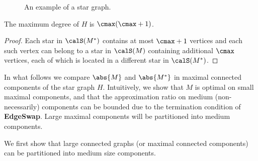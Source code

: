 \begin{figure}
\hspace{3mm}
%
\caption{An example of a star graph.}
\label{fig:conflict}
\end{figure}  

\begin{lemma}
The maximum degree of $H$ is $\cmax(\cmax+1)$.
\end{lemma}
\begin{proof}
Each star in $\calS(M^*)$ contains at most $\cmax+1$ vertices and each
such vertex can belong to a star in $\calS(M)$ containing additional
$\cmax$ vertices, each of which is located in a different star in
$\calS(M^*)$.
\end{proof}

In what follows we compare $\abs{M}$ and $\abs{M^*}$ in maximal
connected components of the star graph $H$.  Intuitively, we show that
$M$ is optimal on small maximal components, and that the approximation
ratio on medium (non-necessarily) components can be bounded due to the
termination condition of \textbf{EdgeSwap}.  Large maximal components
will be partitioned into medium components.

We first show that large connected graphs (or maximal connected
components) can be partitioned into medium size components.

